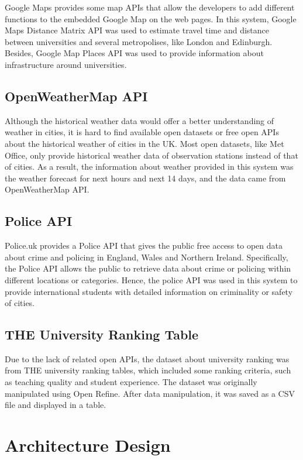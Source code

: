 Google Maps provides some map APIs that allow the developers to add different functions to the embedded Google Map on the web pages. In this system, Google Maps Distance Matrix API was used to estimate travel time and distance between universities and several metropolises, like London and Edinburgh. Besides, Google Map Places API was used to provide information about infrastructure around universities.


\subsection{OpenWeatherMap API
}

Although the historical weather data would offer a better understanding of weather in cities, it is hard to find available open datasets or free open APIs about the historical weather of cities in the UK. Most open datasets, like Met Office, only provide historical weather data of observation stations instead of that of cities. As a result, the information about weather provided in this system was the weather forecast for next hours and next 14 days, and the data came from OpenWeatherMap API.

\subsection{Police API
}

Police.uk provides a Police API that gives the public free access to open data about crime and policing in England, Wales and Northern Ireland. Specifically, the Police API allows the public to retrieve data about crime or policing within different locations or categories. Hence, the police API was used in this system to provide international students with detailed information on criminality or safety of cities. 

\subsection{THE University Ranking Table 
}

Due to the lack of related open APIs, the dataset about university ranking was from THE university ranking tables, which included some ranking criteria, such as teaching quality and student experience.  The dataset was originally manipulated using Open Refine. After data manipulation, it was saved as a CSV file and displayed in a table.

\section{Architecture Design
}


